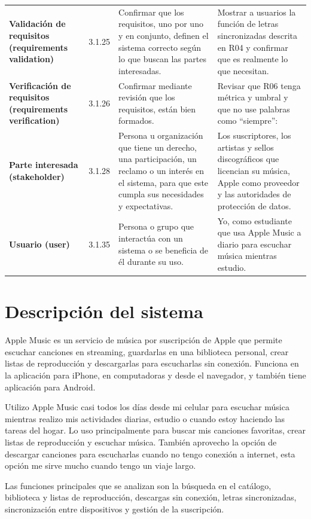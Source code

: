 \documentclass[conference,onecolumn]{IEEEtran}
\begin{document}
{\begin{longtable}{@{}L{0.20\textwidth}L{0.07\textwidth}L{0.34\textwidth}L{0.34\textwidth}@{}}
\textbf{Validación de requisitos (requirements validation)} & 3.1.25 & Confirmar que los requisitos, uno por uno y en conjunto, definen el sistema correcto según lo que buscan las partes interesadas. & Mostrar a usuarios la función de letras sincronizadas descrita en R04 y confirmar que es realmente lo que necesitan.\\
\textbf{Verificación de requisitos (requirements verification)} & 3.1.26 & Confirmar mediante revisión que los requisitos, están bien formados. & Revisar que R06 tenga métrica y umbral y que no use palabras como “siempre”:\\
\textbf{Parte interesada (stakeholder)} & 3.1.28 & Persona u organización que tiene un derecho, una participación, un reclamo o un interés en el sistema, para que este cumpla sus necesidades y expectativas. & Los suscriptores, los artistas y sellos discográficos que licencian su música, Apple como proveedor y las autoridades de protección de datos.\\
\textbf{Usuario (user)} & 3.1.35 & Persona o grupo que interactúa con un sistema o se beneficia de él durante su uso. & Yo, como estudiante que usa Apple Music a diario para escuchar música mientras estudio.\\
\end{longtable}
}

\section{Descripción del sistema}
Apple Music es un servicio de música por suscripción de Apple que permite escuchar canciones en streaming, guardarlas en una biblioteca personal, crear listas de reproducción y descargarlas para escucharlas sin conexión. Funciona en la aplicación para iPhone, en computadoras y desde el navegador, y también tiene aplicación para Android.

Utilizo Apple Music casi todos los días desde mi celular para escuchar música mientras realizo mis actividades diarias, estudio o cuando estoy haciendo las tareas del hogar. Lo uso principalmente para buscar mis canciones favoritas, crear listas de reproducción y escuchar música. También aprovecho la opción de descargar canciones para escucharlas cuando no tengo conexión a internet, esta opción me sirve mucho cuando tengo un viaje largo.

Las funciones principales que se analizan son la búsqueda en el catálogo, biblioteca y listas de reproducción, descargas sin conexión, letras sincronizadas, sincronización entre dispositivos y gestión de la suscripción.
\end{document}
